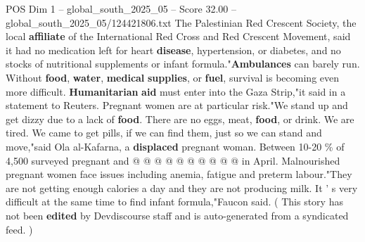 \begin{textsample}{POS Dim 1 – global\_south\_2025\_05 – Score 32.00 – global\_south\_2025\_05/124421806.txt}
The Palestinian Red Crescent Society, the local \textbf{affiliate} of the International Red Cross and Red Crescent Movement, said it had no medication left for heart \textbf{disease}, hypertension, or diabetes, and no stocks of nutritional supplements or infant formula."\textbf{Ambulances} can barely run.
Without \textbf{food}, \textbf{water}, \textbf{medical} \textbf{supplies}, or \textbf{fuel}, survival is becoming even more difficult. \textbf{Humanitarian} \textbf{aid} must enter into the Gaza Strip,"it said in a statement to Reuters.
Pregnant women are at particular risk."We stand up and get dizzy due to a lack of \textbf{food}.
There are no eggs, meat, \textbf{food}, or drink.
We are tired.
We came to get pills, if we can find them, just so we can stand and move,"said Ola al-Kafarna, a \textbf{displaced} pregnant woman.
Between 10-20 \% of 4,500 surveyed pregnant and @ @ @ @ @ @ @ @ @ @ in April.
Malnourished pregnant women face issues including anemia, fatigue and preterm labour."They are not getting enough calories a day and they are not producing milk.
It ' s very difficult at the same time to find infant formula,"Faucon said. ( This story has not been \textbf{edited} by Devdiscourse staff and is auto-generated from a syndicated feed. )

\end{textsample}
